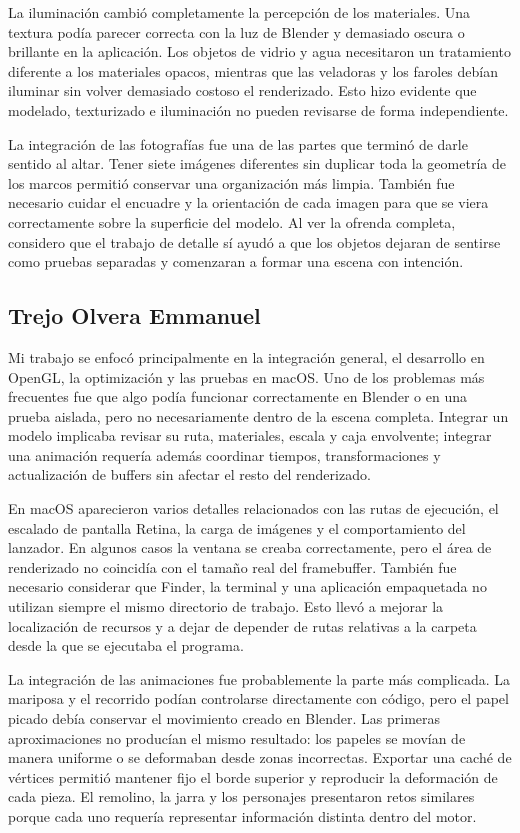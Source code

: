 \documentclass[letter,12pt]{article}
\begin{document}
La iluminación cambió completamente la percepción de los materiales. Una textura podía parecer correcta con la luz de Blender y demasiado oscura o brillante en la aplicación. Los objetos de vidrio y agua necesitaron un tratamiento diferente a los materiales opacos, mientras que las veladoras y los faroles debían iluminar sin volver demasiado costoso el renderizado. Esto hizo evidente que modelado, texturizado e iluminación no pueden revisarse de forma independiente.

La integración de las fotografías fue una de las partes que terminó de darle sentido al altar. Tener siete imágenes diferentes sin duplicar toda la geometría de los marcos permitió conservar una organización más limpia. También fue necesario cuidar el encuadre y la orientación de cada imagen para que se viera correctamente sobre la superficie del modelo. Al ver la ofrenda completa, considero que el trabajo de detalle sí ayudó a que los objetos dejaran de sentirse como pruebas separadas y comenzaran a formar una escena con intención.

\subsection*{Trejo Olvera Emmanuel}

Mi trabajo se enfocó principalmente en la integración general, el desarrollo en OpenGL, la optimización y las pruebas en macOS. Uno de los problemas más frecuentes fue que algo podía funcionar correctamente en Blender o en una prueba aislada, pero no necesariamente dentro de la escena completa. Integrar un modelo implicaba revisar su ruta, materiales, escala y caja envolvente; integrar una animación requería además coordinar tiempos, transformaciones y actualización de buffers sin afectar el resto del renderizado.

En macOS aparecieron varios detalles relacionados con las rutas de ejecución, el escalado de pantalla Retina, la carga de imágenes y el comportamiento del lanzador. En algunos casos la ventana se creaba correctamente, pero el área de renderizado no coincidía con el tamaño real del framebuffer. También fue necesario considerar que Finder, la terminal y una aplicación empaquetada no utilizan siempre el mismo directorio de trabajo. Esto llevó a mejorar la localización de recursos y a dejar de depender de rutas relativas a la carpeta desde la que se ejecutaba el programa.

La integración de las animaciones fue probablemente la parte más complicada. La mariposa y el recorrido podían controlarse directamente con código, pero el papel picado debía conservar el movimiento creado en Blender. Las primeras aproximaciones no producían el mismo resultado: los papeles se movían de manera uniforme o se deformaban desde zonas incorrectas. Exportar una caché de vértices permitió mantener fijo el borde superior y reproducir la deformación de cada pieza. El remolino, la jarra y los personajes presentaron retos similares porque cada uno requería representar información distinta dentro del motor.
\end{document}
